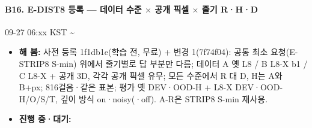\paragraph{B16. E-DIST8 등록 --- 데이터 수준 $\times$ 공개 픽셀 $\times$ 줄기 R·H·D}
{\small 09-27 06:xx KST \textasciitilde{}}
\begin{itemize}
  \item \textbf{해 봄:} 사전 등록 1f1db1e(학습 전, 무료) + 변경 1(7f74f04): 공통 최소 요청(E-STRIP8 S-min) 위에서 줄기별로 답 부분만 다름; 데이터 A 옛 L8 / B L8-X b1 / C L8-X + 공개 3D, 각각 공개 픽셀 유무; 모든 수준에서 R 대 D, H는 A와 B+px; 816걸음·같은 표본; 평가 옛 DEV·OOD-H + L8-X DEV·OOD-H/O/S/T, 깊이 방식 on·noisy(·off). A-R은 STRIP8 S-min 재사용.
  \item \textbf{진행 중·대기:} 
\end{itemize}


